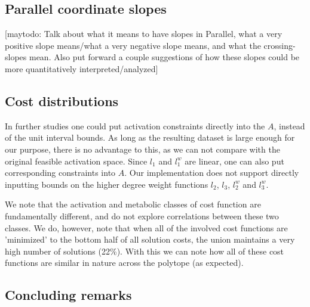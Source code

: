 \subsection{Parallel coordinate slopes} %
\label{sec:parallel_coordinate_slopes}
[maytodo: Talk about what it means to have slopes in Parallel, what a very positive slope means/what a very negative slope means, and what the crossing-slopes mean. Also put forward a couple suggestions of how these slopes could be more quantitatively interpreted/analyzed]

\subsection{Cost distributions} %
\label{sec:cost_distributions}
In further studies one could put activation constraints directly into the $A$, instead of the unit interval bounds. As long as the resulting dataset is large enough for our purpose, there is no advantage to this, as we can not compare with the original feasible activation space. Since $l_1$ and $l_1^w$ are linear, one can also put corresponding constraints into $A$. Our implementation does not support directly inputting bounds on the higher degree weight functions $l_2$, $l_3$, $l_2^w$ and $l_3^w$.

We note that the activation and metabolic classes of cost function are fundamentally different, and do not explore correlations between these two classes. We do, however, note that when all of the involved cost functions are 'minimized' to the bottom half of all solution costs, the union maintains a very high number of solutions (22\%). With this we can note how all of these cost functions are similar in nature across the polytope (as expected).

\subsection{Concluding remarks} %
\label{ssub:concluding_remarks}

